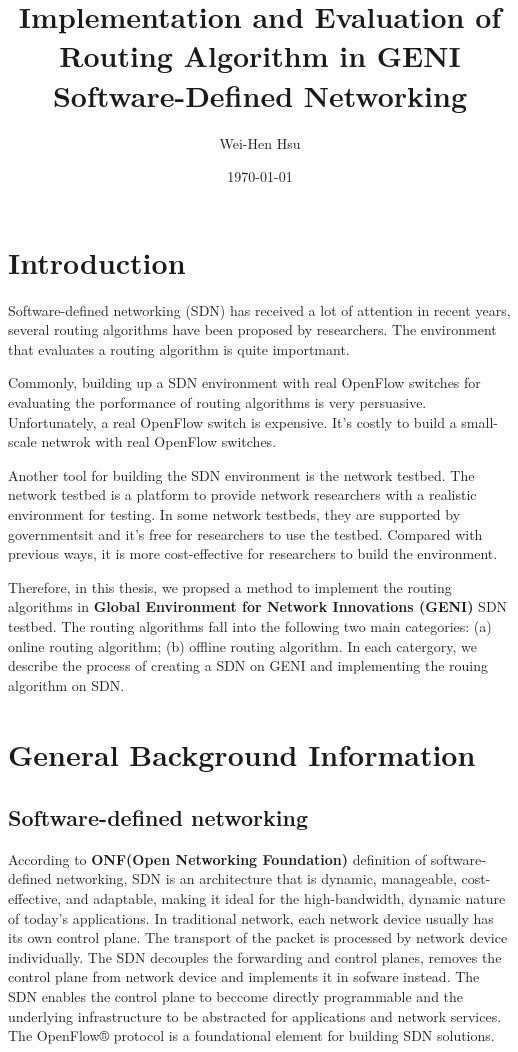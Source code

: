 \documentclass[a4paper,12pt]{report}
\title{Implementation and Evaluation of Routing Algorithm in GENI Software-Defined Networking}
\author{Wei-Hen Hsu}
\date{\today}
\begin{document}
    \begin{large}
    \maketitle{}
    \tableofcontents{}
    \chapter{Introduction}
    \qquad Software-defined networking (SDN) has received a lot of attention in recent years, 
            several routing algorithms have been proposed by researchers. The environment that evaluates a 
            routing algorithm is quite importmant.\par
    \qquad Commonly, building up a SDN environment with real OpenFlow switches for evaluating the porformance
            of routing algorithms is very persuasive. Unfortunately, a real OpenFlow switch is expensive. It's 
            costly to build a small-scale netwrok with real OpenFlow switches.\par
    \qquad Another tool for building the SDN environment is the network testbed. The network testbed is a 
            platform to provide network researchers with a realistic environment for testing. In some network testbeds, they are supported by governmentsit and it's free for researchers to use the testbed. Compared with previous ways, it is more cost-effective for researchers to build the environment.\par
    \qquad Therefore, in this thesis, we propsed a method to implement the routing algorithms in {\bf Global 
            Environment for Network Innovations (GENI)} SDN testbed. The routing algorithms fall into the following two main categories: (a) online routing algorithm; (b) offline routing algorithm. In each catergory, we describe the process of creating a SDN on GENI and implementing the rouing algorithm on SDN. 
    \chapter{General Background Information}
        \section{Software-defined networking}
        \qquad According to {\bf ONF(Open Networking Foundation)} definition of software-defined networking, SDN is 
                an architecture that is dynamic, manageable, cost-effective, and adaptable, making it ideal for the 
                high-bandwidth, dynamic nature of today’s applications. In traditional network, each network device 
                usually has its own control plane. The transport of the packet is processed by network device 
                individually. The SDN decouples the forwarding and control planes, removes the control plane from 
                network device and implements it in sofware instead. The SDN enables the control plane to beccome 
                directly programmable and the underlying infrastructure to be abstracted for applications and network 
                services. The OpenFlow® protocol is a foundational element for building SDN solutions.

\end{large}
\end{document}
